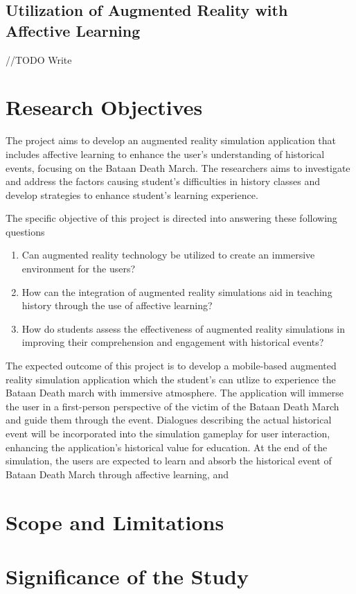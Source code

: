 \subsection{Utilization of Augmented Reality with Affective Learning}
//TODO Write


\section{Research Objectives}
The project aims to develop an augmented reality simulation application that includes affective learning to enhance the user's understanding of historical events, focusing on the Bataan Death March. The researchers aims to investigate and address the factors causing student's difficulties in history classes and develop strategies to enhance student's learning experience.

The specific objective of this project is directed into answering these following questions
\begin{enumerate}
    \item Can augmented reality technology be utilized to create an immersive environment for the users?
    \item How can the integration of augmented reality simulations aid in teaching history through the use of affective learning?
    \item How do students assess the effectiveness of augmented reality simulations in improving their comprehension and engagement with historical events? 
\end{enumerate}

The expected outcome of this project is to develop a mobile-based augmented reality simulation application which the student's can utlize to experience the Bataan Death march with immersive atmosphere. The application will immerse the user in a first-person perspective of the victim of the Bataan Death March and guide them through the event. Dialogues describing the actual historical event will be incorporated into the simulation gameplay for user interaction, enhancing the application's historical value for education. At the end of the simulation, the users are expected to learn and absorb the historical event of Bataan Death March through affective learning, and 

\section{Scope and Limitations}

\section{Significance of the Study}
